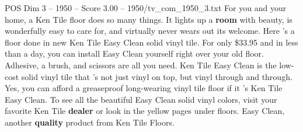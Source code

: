 \begin{textsample}{POS Dim 3 – 1950 – Score 3.00 – 1950/tv\_com\_1950\_3.txt}  \label{ex:f3_pos_015}
For you and your home, a Ken Tile floor does so many things.
It lights up a \textbf{room} with beauty, is wonderfully easy to care for, and virtually never wears out its welcome.
Here 's a floor done in new Ken Tile Easy Clean solid vinyl tile.
For only \$33.95 and in less than a day, you can install Easy Clean yourself right over your old floor.
Adhesive, a brush, and scissors are all you need.
Ken Tile Easy Clean is the low-cost solid vinyl tile that 's not just vinyl on top, but vinyl through and through.
Yes, you can afford a greaseproof long-wearing vinyl tile floor if it 's Ken Tile Easy Clean.
To see all the beautiful Easy Clean solid vinyl colors, visit your favorite Ken Tile \textbf{dealer} or look in the yellow pages under floors.
Easy Clean, another \textbf{quality} product from Ken Tile Floors.

\end{textsample}
